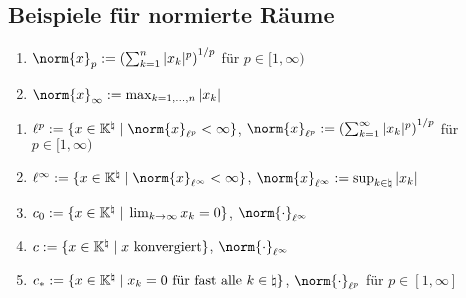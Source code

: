 \subsection{%
    Beispiele für normierte Räume%
}

\begin{Bsp}
    \begin{enumerate}[label=\emph{(\alph*)}]
        \item
        $\norm{x}_p := \left(\sum_{k=1}^n |x_k|^p\right)^{1/p}$ für $p \in [1, \infty)$
        
        \item
        $\norm{x}_\infty := \max_{k=1,\dotsc,n} |x_k|$
    \end{enumerate}
\end{Bsp}

\begin{Bsp}
    \begin{enumerate}[label=\emph{(\alph*)}]
        \item
        $\ell^p := \{x \in \KK^\natural \;|\;
        \norm{x}_{\ell^p} < \infty\}$, $\norm{x}_{\ell^p} :=
        \left(\sum_{k=1}^\infty |x_k|^p\right)^{1/p}$ für $p \in [1, \infty)$
        
        \item
        $\ell^\infty := \{x \in \KK^\natural \;|\;
        \norm{x}_{\ell^\infty} < \infty\}$, $\norm{x}_{\ell^\infty} :=
        \sup_{k \in \natural} |x_k|$
        
        \item
        $c_0 := \{x \in \mathbb{K}^\natural \;|\; \lim_{k \to \infty} x_k = 0\}$,
        $\norm{\cdot}_{\ell^\infty}$
        
        \item
        $c := \{x \in \mathbb{K}^\natural \;|\; x \text{ konvergiert}\}$,
        $\norm{\cdot}_{\ell^\infty}$
        
        \item
        $c_\ast := \{x \in \mathbb{K}^\natural \;|\; x_k = 0 \text{ für fast alle }
        k \in \natural\}$, $\norm{\cdot}_{\ell^p}$ für $p \in [1, \infty]$
    \end{enumerate}
\end{Bsp}

\linie
\pagebreak

